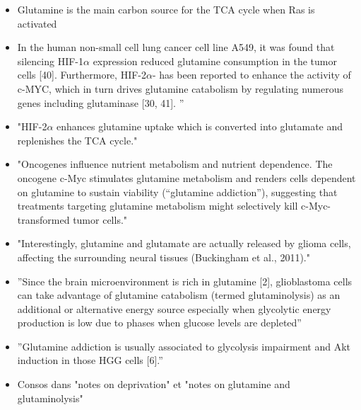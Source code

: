 \documentclass[11pt,a4paper]{article}
\begin{document}
\begin{itemize}
\item Glutamine is the main carbon source for the TCA cycle when Ras is activated \cite{Ma2022}
\item In the human non-small cell lung cancer cell line A549, it was found that silencing HIF-1$\alpha$ expression reduced glutamine consumption in the tumor cells [40]. Furthermore, HIF-2$\alpha$-
has been reported to enhance the activity of c-MYC, which in turn drives glutamine
catabolism by regulating numerous genes including glutaminase [30, 41]. ”\cite{Ma2022}
\item "HIF-2$\alpha$ enhances glutamine uptake which is
converted into glutamate and replenishes the TCA cycle." \cite{Mudassar2020}
\item "Oncogenes influence nutrient metabolism and nutrient dependence. The oncogene c-Myc stimulates glutamine metabolism and renders cells dependent on glutamine to sustain viability (“glutamine addiction”), suggesting that treatments targeting glutamine metabolism might selectively kill c-Myc-transformed tumor cells."\cite{Yang2009}
\item "Interestingly, glutamine and glutamate are actually released by glioma cells, affecting the surrounding neural tissues (Buckingham et al., 2011)."\cite{Strickland2017}
\item ”Since the brain microenvironment is rich in glutamine [2], glioblastoma cells can take advantage of glutamine catabolism (termed glutaminolysis) as an additional or alternative energy source especially when glycolytic energy production is low due to phases when glucose levels are depleted”\cite{Stuart2023}
\item ”Glutamine addiction is usually associated to glycolysis impairment and Akt induction in those HGG cells [6].”\cite{Fuchs2020}
\item Consos dans "notes on deprivation" et "notes on glutamine and glutaminolysis" 
\end{itemize}
\end{document}
